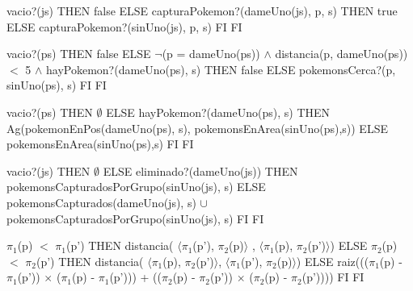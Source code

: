 \begin{tad}{}
		{\IF vacio?(js) THEN
			false
		ELSE
			{\IF capturaPokemon?(dameUno(js), p, s) THEN
				true
			ELSE
				capturaPokemon?(sinUno(js), p, s)
			FI}
		FI}



		{\IF vacio?(ps) THEN
			false
		ELSE
			{\IF $\neg$(p = dameUno(ps)) $\land$ distancia(p, dameUno(ps)) $<$ 5 $\land$ hayPokemon?(dameUno(ps), s) THEN
				false
			ELSE
				pokemonsCerca?(p, sinUno(ps), s)
			FI}
		FI}




		{\IF vacio?(ps) THEN
			$\emptyset$
		ELSE
			{\IF hayPokemon?(dameUno(ps), s) THEN
				Ag(pokemonEnPos(dameUno(ps), s), pokemonsEnArea(sinUno(ps),s))
			ELSE
				pokemonsEnArea(sinUno(ps),s)
			FI}
		FI}

		{\IF vacio?(js) THEN
			$\emptyset$
		ELSE
			{\IF eliminado?(dameUno(js)) THEN
				pokemonsCapturadosPorGrupo(sinUno(js), s)
			ELSE
				pokemonsCapturados(dameUno(js), s) $\cup$ pokemonsCapturadosPorGrupo(sinUno(js), s)
			FI}
		FI}
		
		
		
		{\IF $\pi_1$(p) $<$ $\pi_1$(p')  THEN
			distancia( $\langle\pi_1$(p'), $\pi_2$(p)$\rangle$ , $\langle\pi_1$(p), $\pi_2$(p')$\rangle$)
		ELSE
			{\IF $\pi_2$(p) $<$ $\pi_2$(p') THEN
				distancia( $\langle\pi_1$(p), $\pi_2$(p')$\rangle$, $\langle\pi_1$(p'), $\pi_2$(p)$\rangle$)
			ELSE
				raiz((($\pi_1$(p) - $\pi_1$(p')) $\times$ ($\pi_1$(p) - $\pi_1$(p'))) + (($\pi_2$(p) - 		$\pi_2$(p')) $\times$ ($\pi_2$(p) - $\pi_2$(p'))))
			FI}
		FI}
		
		
		

\end{tad}
